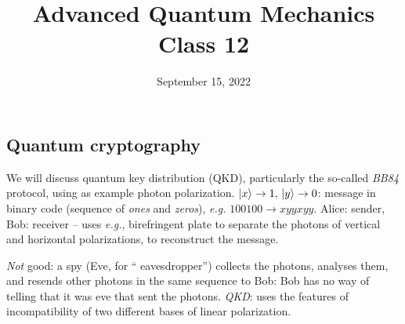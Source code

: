 \documentclass[12pt]{article}
\title{Advanced Quantum Mechanics\\Class 12}
\date{September 15, 2022}                                           %
\begin{document}
\maketitle


\subsection{Quantum cryptography}

We will discuss quantum key distribution (QKD),
particularly the so-called \emph{BB84} protocol,
using as example photon polarization.
$\ket{x} \to 1,\,\ket{y} \to 0$: message in binary code
(sequence of \emph{ones} and \emph{zeros}),
\textit{e.g.} $100100 \to xyyxyy$.
Alice: sender, Bob: receiver --
uses \textit{e.g.}, birefringent
plate to separate the
photons of vertical and
horizontal polarizations,
to reconstruct the message.

\emph{Not} good: a spy (Eve, for `` eavesdropper'') collects the
photons, analyses them, and resends
other photons in the same sequence
to Bob: Bob has no way of telling
that it was eve that sent the photons.
\emph{QKD}: uses the features of incompatibility of two
different bases of linear polarization.
\end{document}
